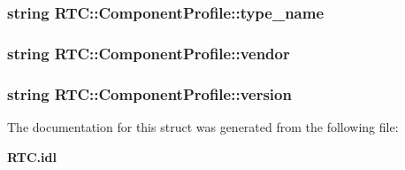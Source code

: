 \subsubsection{\setlength{\rightskip}{0pt plus 5cm}string {\bf RTC::Component\-Profile::type\_\-name}}\label{structRTC_1_1ComponentProfile_RTC_1_1ComponentProfileo1}


\subsubsection{\setlength{\rightskip}{0pt plus 5cm}string {\bf RTC::Component\-Profile::vendor}}\label{structRTC_1_1ComponentProfile_RTC_1_1ComponentProfileo4}


\subsubsection{\setlength{\rightskip}{0pt plus 5cm}string {\bf RTC::Component\-Profile::version}}\label{structRTC_1_1ComponentProfile_RTC_1_1ComponentProfileo3}




The documentation for this struct was generated from the following file:\begin{CompactItemize}
\item 
{\bf RTC.idl}\end{CompactItemize}
